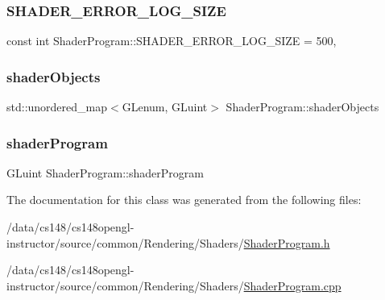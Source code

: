 \subsubsection{\texorpdfstring{S\+H\+A\+D\+E\+R\+\_\+\+E\+R\+R\+O\+R\+\_\+\+L\+O\+G\+\_\+\+S\+I\+ZE}{SHADER\_ERROR\_LOG\_SIZE}}
{\footnotesize\ttfamily const int Shader\+Program\+::\+S\+H\+A\+D\+E\+R\+\_\+\+E\+R\+R\+O\+R\+\_\+\+L\+O\+G\+\_\+\+S\+I\+ZE = 500\hspace{0.3cm}{\ttfamily [static]}, {\ttfamily [private]}}

\hypertarget{class_shader_program_a8eabcc4ff693bc9430daef8cfc6008de}{}\label{class_shader_program_a8eabcc4ff693bc9430daef8cfc6008de} 
\subsubsection{\texorpdfstring{shader\+Objects}{shaderObjects}}
{\footnotesize\ttfamily std\+::unordered\+\_\+map$<$G\+Lenum, G\+Luint$>$ Shader\+Program\+::shader\+Objects\hspace{0.3cm}{\ttfamily [private]}}

\hypertarget{class_shader_program_a7d8f2b643a81ac4097606e43ade92f81}{}\label{class_shader_program_a7d8f2b643a81ac4097606e43ade92f81} 
\subsubsection{\texorpdfstring{shader\+Program}{shaderProgram}}
{\footnotesize\ttfamily G\+Luint Shader\+Program\+::shader\+Program\hspace{0.3cm}{\ttfamily [protected]}}



The documentation for this class was generated from the following files\+:\begin{DoxyCompactItemize}
\item 
/data/cs148/cs148opengl-\/instructor/source/common/\+Rendering/\+Shaders/\hyperlink{_shader_program_8h}{Shader\+Program.\+h}\item 
/data/cs148/cs148opengl-\/instructor/source/common/\+Rendering/\+Shaders/\hyperlink{_shader_program_8cpp}{Shader\+Program.\+cpp}\end{DoxyCompactItemize}
